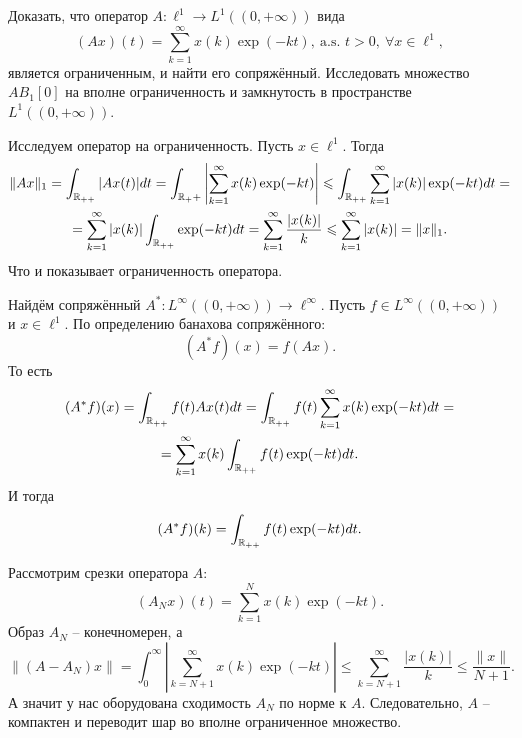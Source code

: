 \begin{task}[T16]
    Доказать, что оператор $A\colon \ell^1 \to L^1((0, +\infty))$ вида
    \[
        (Ax)(t) = \sum_{k = 1}^{\infty} x(k)\exp(-kt), \ \text{a.s. } t > 0, \ \forall x \in \ell^1,
    \]
    является ограниченным, и найти его сопряжённый.
    Исследовать множество $AB_1[0]$ на вполне ограниченность и замкнутость в пространстве $L^1((0, +\infty))$.
\end{task}
\begin{solution}
    Исследуем оператор на ограниченность.
    Пусть $x \in \ell^1$.
    Тогда
    \begin{multline*}
        \|Ax\|_1 = \int_{\mathbb{R}_{++}} |Ax(t)|dt = \int_{\mathbb{R}_++} \left|\sum_{k = 1}^{\infty}x(k)\exp(-kt)\right| \leqslant \int_{\mathbb{R}_{++}}\sum_{k = 1}^{\infty} |x(k)|\exp(-kt)dt = \\ = \sum_{k = 1}^{\infty}|x(k)| \int_{\mathbb{R}_{++}} \exp(-kt)dt = \sum_{k = 1}^{\infty} \frac{|x(k)|}{k} \leqslant \sum_{k = 1}^{\infty} |x(k)| = \|x\|_1.
    \end{multline*}
    Что и показывает ограниченность оператора.

    Найдём сопряжённый $A^*\colon L^\infty((0, +\infty)) \to \ell^{\infty}$.
    Пусть $f \in L^{\infty}((0, +\infty))$ и $x \in \ell^1$.
    По определению банахова сопряжённого:
    \[
        (A^{*}f)(x) = f(Ax).
    \]
    То есть
    \begin{multline*}
    (A^{*}f)(x) = \int_{\mathbb{R}_{++}} f(t)Ax(t)dt = \int_{\mathbb{R}_{++}} f(t) \sum_{k = 1}^{\infty} x(k)\exp(-kt)dt = \\
    = \sum_{k = 1}^{\infty} x(k) \int_{\mathbb{R}_{++}} f(t) \exp(-kt) dt.
    \end{multline*}
    И тогда
    \[
        (A^*f)(k) = \int_{\mathbb{R}_{++}} f(t)\exp(-kt)dt.
    \]

    Рассмотрим срезки оператора $A\colon$
    \[
        (A_N x)(t) = \sum_{k = 1}^{N} x(k)\exp(-kt).
    \]
    Образ $A_N$ -- конечномерен, а
    \[
        \|(A - A_N)x\| = \int_0^\infty \left|\sum_{k = N + 1}^{\infty} x(k)\exp(-kt)\right| \leq \sum_{k = N + 1}^{\infty} \frac{|x(k)|}{k} \leq \frac{\|x\|}{N + 1}.
    \]
    А значит у нас оборудована сходимость $A_N$ по норме к $A$.
    Следовательно, $A$ -- компактен и переводит шар во вполне ограниченное множество.


\end{solution}
